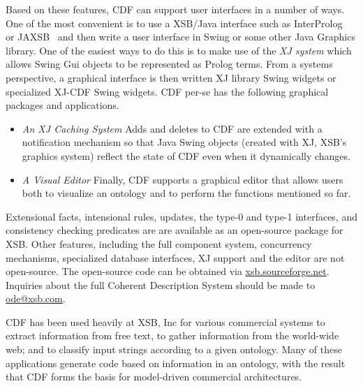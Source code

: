 Based on these features, CDF can support user interfaces in a number
of ways.  One of the most convenient is to use a XSB/Java interface
such as InterProlog~\cite{} or JAXSB~\cite{} and then write a user
interface in Swing or some other Java Graphics library.  One of the
easiest ways to do this is to make use of the {\em XJ system} which
allows Swing Gui objects to be represented as Prolog terms.  From a
systems perspective, a graphical interface is then written XJ library
Swing widgets or specialized XJ-CDF Swing widgets.  CDF per-se has the
following graphical packages and applications.
%
\begin{itemize}
%
\item {\em An XJ Caching System} Adds and deletes to CDF are extended
with a notification mechanism so that Java Swing objects (created with
XJ, XSB's graphics system) reflect the state of CDF even when it
dynamically changes.
%
\item {\em A Visual Editor} Finally,  CDF supports a graphical editor
that allows users both to visualize an ontology and to perform the
functions mentioned so far.
\end{itemize}
%
Extensional facts, intensional rules, updates, the type-0 and type-1
interfaces, and consistency checking predicates are are available as
an open-source package for XSB.  Other features, including the full
component system, concurrency mechanisms, specialized database
interfaces, XJ support and the editor are not open-source.  The
open-source code can be obtained via \url{xsb.sourceforge.net}.
Inquiries about the full Coherent Description System should be made to
\url{ode@xsb.com}.

CDF has been used heavily at XSB, Inc for various commercial systems
to extract information from free text, to gather information from the
world-wide web; and to classify input strings according to a given
ontology.  Many of these applications generate code based on
information in an ontology, with the result that CDF forms the basis
for model-driven commercial architectures. 


